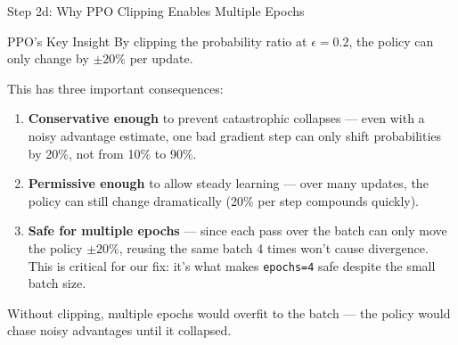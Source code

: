 \documentclass[aspectratio=169,11pt]{beamer}
\begin{document}
\begin{frame}{Step 2d: Why PPO Clipping Enables Multiple Epochs}
  \small
  \begin{block}{PPO's Key Insight}
    By clipping the probability ratio at $\epsilon = 0.2$, the policy can only change by
    $\pm 20\%$ per update.
  \end{block}

  \medskip
  This has three important consequences:

  \begin{enumerate}\setlength\itemsep{6pt}
    \item \textbf{Conservative enough} to prevent catastrophic collapses ---
      even with a noisy advantage estimate, one bad gradient step can only
      shift probabilities by 20\%, not from 10\% to 90\%.

    \item \textbf{Permissive enough} to allow steady learning ---
      over many updates, the policy can still change dramatically
      (20\% per step compounds quickly).

    \item \textbf{Safe for multiple epochs} --- since each pass over the batch
      can only move the policy $\pm 20\%$, reusing the same batch 4 times
      won't cause divergence.  This is \alert{critical for our fix}: it's what
      makes \texttt{epochs=4} safe despite the small batch size.
  \end{enumerate}

  \medskip
  Without clipping, multiple epochs would overfit to the batch ---
  the policy would chase noisy advantages until it collapsed.
\end{frame}
\end{document}
